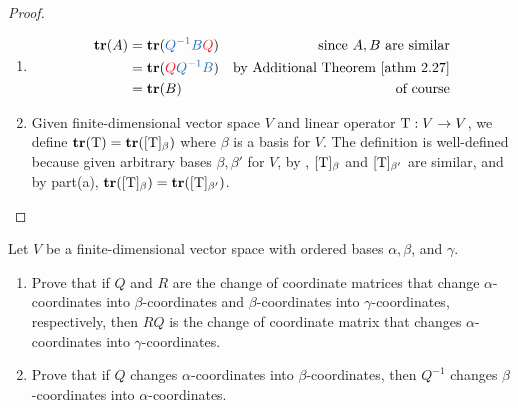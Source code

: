 \begin{proof} \ 

\begin{enumerate}
\item
\begin{align*}
    \TRACE(A) & = \TRACE(\BLUE{Q^{-1}B}\RED{Q}) & \text{since \(A, B\) are similar} \\
              & = \TRACE(\RED{Q}\BLUE{Q^{-1}B}) & \text{by \ATHM{2.27}} \\
              & = \TRACE(B) & \text{of course}
\end{align*}

\item Given finite-dimensional vector space \(V\) and linear operator \(\mathrm{T} : V \to V\), we define \(\textbf{tr}(\mathrm{T}) = \textbf{tr}([\mathrm{T}]_{\beta})\) where \(\beta\) is a basis for \(V\).
The definition is well-defined because given arbitrary bases \(\beta, \beta'\) for \(V\), by , \([\mathrm{T}]_{\beta}\) and \([\mathrm{T}]_{\beta'}\) are similar, and by part(a), \(\textbf{tr}([\mathrm{T}]_{\beta}) = \textbf{tr}([\mathrm{T}]_{\beta'})\).
\end{enumerate}
\end{proof}

\begin{exercise} \label{exercise 2.5.11}
Let \(V\) be a finite-dimensional vector space with ordered bases \(\alpha, \beta\), and \(\gamma\).
\begin{enumerate}
\item Prove that if \(Q\) and \(R\) are the change of coordinate matrices that change \(\alpha\)-coordinates into \(\beta\)-coordinates and \(\beta\)-coordinates into \(\gamma\)-coordinates, respectively, then \(RQ\) is the change of coordinate matrix that changes \(\alpha\)-coordinates into \(\gamma\)-coordinates.

\item Prove that if \(Q\) changes \(\alpha\)-coordinates into \(\beta\)-coordinates, then \(Q^{-1}\) changes \(\beta\)-coordinates into \(\alpha\)-coordinates.
\end{enumerate}
\end{exercise}

